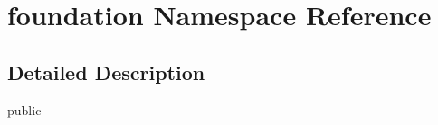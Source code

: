 \hypertarget{namespacefoundation}{}\section{foundation Namespace Reference}
\label{namespacefoundation}


\subsection{Detailed Description}
public 